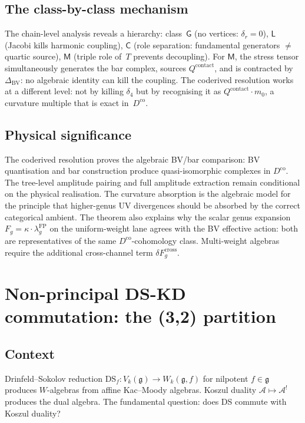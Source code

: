 \documentclass[11pt]{amsart}
\newcommand{\cA}{\mathcal{A}}
\newcommand{\g}{\mathfrak{g}}
\theoremstyle{plain}
\theoremstyle{definition}
\theoremstyle{remark}
\begin{document}
\subsection{The class-by-class mechanism}

The chain-level analysis reveals a hierarchy:
class~$\mathsf{G}$ (no vertices: $\delta_r = 0$),
$\mathsf{L}$ (Jacobi kills harmonic coupling),
$\mathsf{C}$ (role separation: fundamental generators $\neq$
quartic source), $\mathsf{M}$ (triple role of~$T$ prevents
decoupling). For $\mathsf{M}$, the stress tensor simultaneously
generates the bar complex, sources $Q^{\mathrm{contact}}$, and
is contracted by~$\Delta_{\mathrm{BV}}$: no algebraic identity
can kill the coupling. The coderived resolution works at a
different level: not by killing $\delta_4$ but by recognising it
as $Q^{\mathrm{contact}} \cdot m_0$, a curvature multiple that
is exact in~$D^{\mathrm{co}}$.

\subsection{Physical significance}

The coderived resolution proves the algebraic BV/bar comparison:
BV quantisation and bar construction produce quasi-isomorphic
complexes in $D^{\mathrm{co}}$.  The tree-level amplitude pairing
and full amplitude extraction remain conditional on the physical
realisation.  The curvature absorption is the algebraic model for
the principle that higher-genus UV divergences should be absorbed
by the correct categorical ambient. The
theorem also explains why the scalar genus expansion
$F_g = \kappa \cdot \lambda_g^{\mathrm{FP}}$ on the
uniform-weight lane agrees with the BV effective action:
both are representatives of the same $D^{\mathrm{co}}$-cohomology
class.  Multi-weight algebras require the additional
cross-channel term $\delta F_g^{\mathrm{cross}}$.


\section{Non-principal DS-KD commutation: the (3,2) partition}

\subsection{Context}

Drinfeld--Sokolov reduction $\mathrm{DS}_f\colon V_k(\g) \to
W_k(\g, f)$ for nilpotent $f \in \g$ produces $W$-algebras from
affine Kac--Moody algebras. Koszul duality
$\cA \mapsto \cA^!$ produces the dual algebra. The fundamental
question: does DS commute with Koszul duality?
\end{document}
